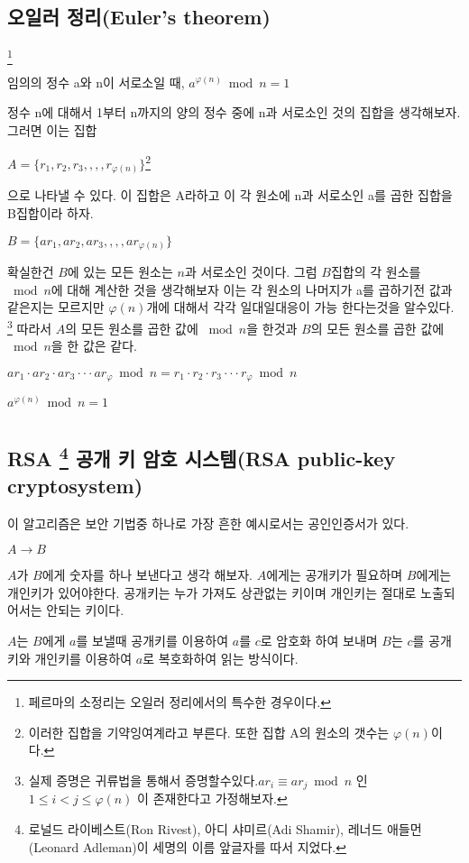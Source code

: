 \documentclass{oblivoir}
\begin{document}
\section{오일러 정리(Euler's theorem)} \footnote{페르마의 소정리는 오일러 정리에서의 특수한 경우이다.}
\begin{justbox}
임의의 정수 a와 n이 서로소일 때, $a^{\varphi(n)} \bmod n = 1$
\end{justbox}
정수 n에 대해서 1부터 n까지의 양의 정수 중에 n과 서로소인 것의 집합을 생각해보자.
그러면 이는 집합
\begin{center}
    $A = \{ r_1 ,r_2,r_3,,,,r_{\varphi(n)}\}$\footnote{이러한 집합을 기약잉여계라고 부른다. 또한 집합 A의 원소의 갯수는 $\varphi(n)$이다.}
\end{center}
으로 나타낼 수 있다. 이 집합은 A라하고 이 각 원소에 n과 서로소인 a를 곱한 집합을 B집합이라 하자.
\begin{center}
    $B = \{ ar_1 ,ar_2,ar_3,,,,ar_{\varphi(n)}\} $
\end{center}
확실한건 $B$에 있는 모든 원소는 $n$과 서로소인 것이다. 그럼 $B$집합의 각 원소를 $\bmod n$에 대해 계산한 것을 생각해보자 이는 각 원소의 나머지가 a를 곱하기전 값과 같은지는 모르지만 $\varphi(n)$개에 대해서 각각 일대일대응이 가능 한다는것을 알수있다. \footnote{실제 증명은 귀류법을 통해서 증명할수있다.$ar_i  \equiv ar_j \bmod n $ 인 $1 \le i < j \le \varphi(n)$ 이 존재한다고 가정해보자.}
따라서 $A$의 모든 원소를 곱한 값에 $\bmod n$을 한것과 $B$의 모든 원소를 곱한 값에 $\bmod n$을 한 값은 같다.
\begin{center}
    $ar_1 \cdot ar_2 \cdot ar_3 \cdot\cdot\cdot ar_{\varphi}\bmod n = r_1 \cdot r_2 \cdot r_3 \cdot\cdot\cdot r_{\varphi} \bmod n$
\end{center}
\begin{center}
    $a^{\varphi(n)}\bmod n= 1$
\end{center}

\newpage
\chapter{}
\section{RSA \footnote{로널드 라이베스트(Ron Rivest), 아디 샤미르(Adi Shamir), 레너드 애들먼(Leonard Adleman)이 세명의 이름 앞글자를 따서 지었다.} 공개 키 암호 시스템(RSA public-key cryptosystem)}

이 알고리즘은 보안 기법중 하나로 가장 흔한 예시로서는 공인인증서가 있다.
\begin{center}
    $A \longrightarrow B$
\end{center}
$A$가 $B$에게 숫자를 하나 보낸다고 생각 해보자. $A$에게는 공개키가 필요하며 $B$에게는 개인키가 있어야한다. 공개키는 누가 가져도 상관없는 키이며 개인키는 절대로 노출되어서는 안되는 키이다.\par
$A$는 $B$에게 $a$를 보낼때 공개키를 이용하여 $a$를 $c$로 암호화 하여 보내며 $B$는 $c$를 공개키와 개인키를 이용하여 $a$로 복호화하여 읽는 방식이다.
\end{document}
